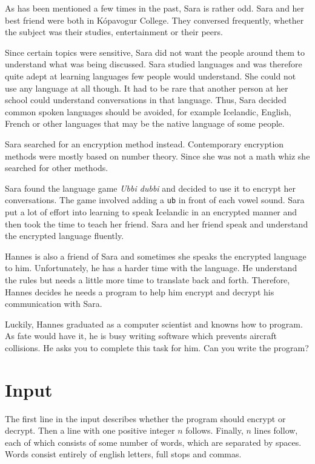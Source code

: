 
As has been mentioned a few times in the past, Sara is rather odd.
Sara and her best friend were both in Kópavogur College.
They conversed frequently, whether the subject was their studies, entertainment or their peers.

Since certain topics were sensitive, Sara did not want the people around them to understand what was being discussed.
Sara studied languages and was therefore quite adept at learning languages few people would understand.
She could not use any language at all though.
It had to be rare that another person at her school could understand conversations in that language.
Thus, Sara decided common spoken languages should be avoided, for example Icelandic, English, French or other languages that may be the native language of some people.

Sara searched for an encryption method instead.
Contemporary encryption methods were mostly based on number theory.
Since she was not a math whiz she searched for other methods.

Sara found the language game \emph{Ubbi dubbi} and decided to use it to encrypt her conversations.
The game involved adding a \texttt{ub} in front of each vowel sound.
Sara put a lot of effort into learning to speak Icelandic in an encrypted manner and then took the time to teach her friend.
Sara and her friend speak and understand the encrypted language fluently.

Hannes is also a friend of Sara and sometimes she speaks the encrypted language to him.
Unfortunately, he has a harder time with the language.
He understand the rules but needs a little more time to translate back and forth.
Therefore, Hannes decides he needs a program to help him encrypt and decrypt his communication with Sara.

Luckily, Hannes graduated as a computer scientist and knowns how to program.
As fate would have it, he is busy writing software which prevents aircraft collisions.
He asks you to complete this task for him.
Can you write the program?

\section*{Input}
The first line in the input describes whether the program should encrypt or decrypt.
Then a line with one positive integer $n$ follows.
Finally, $n$ lines follow, each of which consists of some number of words, which are separated by spaces.
Words consist entirely of english letters, full stops and commas.

